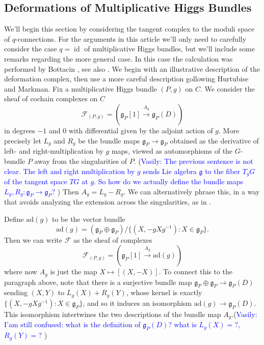 \documentclass[11pt, oneside, reqno]{amsart}
\theoremstyle{definition} \newtheorem{definition}{Definition}[section]
\theoremstyle{definition} \newtheorem{remark}[definition]{Remark}
\theoremstyle{definition} \newtheorem{remarks}[definition]{Remarks}
\theoremstyle{definition} \newtheorem{question}[definition]{Question}
\theoremstyle{definition} \newtheorem*{note}{Note}
\theoremstyle{definition} \newtheorem{example}[definition]{Example}
\theoremstyle{definition} \newtheorem{examples}[definition]{Examples}
\renewcommand{\gg}{\mathfrak{g}}
\newcommand{\mr}[1]{\mathrm{#1}}
\newcommand{\mc}[1]{\mathcal{#1}}
\DeclareMathOperator{\id}{id}
\newcommand{\ad}{\mr{ad}}
\newcommand{\vasily}[1]{(\textcolor{blue}{Vasily: #1})}
\begin{document}
\subsection{Deformations of Multiplicative Higgs Bundles} \label{def_section}
We'll begin this section by considering the tangent complex to the moduli space of $q$-connections.  For the arguments in this article we'll only need to carefully consider the case $q=\id$ of multiplicative Higgs bundles, but we'll include some remarks regarding the more general case.  In this case the calculation was performed by Bottacin \cite{Bottacin}, see also \cite[Section 4]{HurtubiseMarkman}. We begin with an illustrative description of the deformation complex, then use a more careful description gollowing Hurtubise and Markman.  Fix a multiplicative Higgs bundle $(P,g)$ on $C$.  We consider the sheaf of cochain complexes on $C$
\[\mc F_{(P,g)} = (\gg_P[1] \overset {A_g} {\to} \gg_P(D))\]
in degrees $-1$ and 0 with differential given by the adjoint action of $g$.  More precisely let $L_g$ and $R_g$ be the bundle maps $\gg_P \to \gg_P$ obtained as the derivative of left- and right-multiplication by $g$ maps, viewed as automorphisms of the $G$-bundle $P$ away from the singularities of $P$. \vasily{The previous sentence is not clear. The left and right multiplication by $g$ sends
Lie algebra $\mathfrak{g}$ to the fiber $T_{g} G$  of the tangent space $T G$ at $g$. So how do we actually define the bundle maps $L_{g}, R_{g}: \mathfrak{g}_{P} \to \mathfrak{g}_{P}$?   } Then $A_g = L_g - R_g$.  We can alternatively phrase this, in a way that avoids analyzing the extension across the singularities, as in \cite[Section 4]{HurtubiseMarkman}.  
 
Define $\ad(g)$ to be the vector bundle
\[\ad(g) = (\gg_P \oplus \gg_P)/\{(X, -g X g^{-1}): X \in \gg_P\}.\]
Then we can write $\mc F$ as the sheaf of complexes
\[\mc F_{(P,g)} = (\gg_P[1] \overset {A_g} {\to} \ad(g))\]
where now $A_g$ is just the map $X \mapsto [(X,-X)]$.  To connect this to the paragraph above, note that there is a surjective bundle map $\gg_P \oplus \gg_P \to \gg_P(D)$ sending $(X,Y)$ to $L_g(X) + R_g(Y)$, whose kernel is exactly $\{(X, -g X g^{-1}): X \in \gg_P\}$, and so it induces an isomorphism $\ad(g) \to \gg_P(D)$.  This isomorphism intertwines the two descriptions of the bundle map $A_g$.\vasily{I'am still confused: what is the definition of $\mathfrak{g}_P(D)$?
what is $L_{g}(X) = ?$, $R_{g}(Y) = ? $  }
\end{document}
